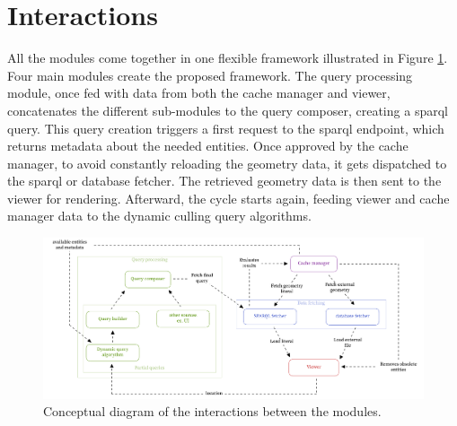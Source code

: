 \section{Interactions} \label{sec:interactions}

All the modules come together in one flexible framework illustrated in Figure \ref{fig:interactionModules}. Four main modules create the proposed framework. The query processing module, once fed with data from both the cache manager and viewer, concatenates the different sub-modules to the query composer, creating a \ac{sparql} query. This query creation triggers a first request to the \ac{sparql} endpoint, which returns metadata about the needed entities. Once approved by the cache manager, to avoid constantly reloading the geometry data, it gets dispatched to the \ac{sparql} or database fetcher. The retrieved geometry data is then sent to the viewer for rendering. Afterward, the cycle starts again, feeding viewer and cache manager data to the dynamic culling query algorithms.

\begin{figure}[H]
  \centering
  \includegraphics[width=\textwidth]{figures/pdf/interactions_concept.pdf}
  \caption[Interactions modular framework]{Conceptual diagram of the interactions between the modules.}
  \label{fig:interactionModules}
\end{figure}
